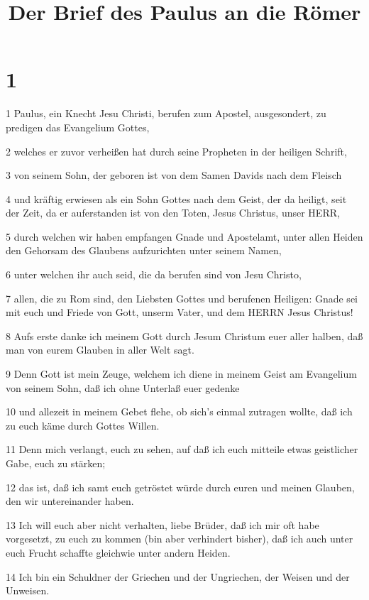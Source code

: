 

\title{Der Brief des Paulus an die Römer}


\chapter{1}

\par 1 Paulus, ein Knecht Jesu Christi, berufen zum Apostel, ausgesondert, zu predigen das Evangelium Gottes,
\par 2 welches er zuvor verheißen hat durch seine Propheten in der heiligen Schrift,
\par 3 von seinem Sohn, der geboren ist von dem Samen Davids nach dem Fleisch
\par 4 und kräftig erwiesen als ein Sohn Gottes nach dem Geist, der da heiligt, seit der Zeit, da er auferstanden ist von den Toten, Jesus Christus, unser HERR,
\par 5 durch welchen wir haben empfangen Gnade und Apostelamt, unter allen Heiden den Gehorsam des Glaubens aufzurichten unter seinem Namen,
\par 6 unter welchen ihr auch seid, die da berufen sind von Jesu Christo,
\par 7 allen, die zu Rom sind, den Liebsten Gottes und berufenen Heiligen: Gnade sei mit euch und Friede von Gott, unserm Vater, und dem HERRN Jesus Christus!
\par 8 Aufs erste danke ich meinem Gott durch Jesum Christum euer aller halben, daß man von eurem Glauben in aller Welt sagt.
\par 9 Denn Gott ist mein Zeuge, welchem ich diene in meinem Geist am Evangelium von seinem Sohn, daß ich ohne Unterlaß euer gedenke
\par 10 und allezeit in meinem Gebet flehe, ob sich's einmal zutragen wollte, daß ich zu euch käme durch Gottes Willen.
\par 11 Denn mich verlangt, euch zu sehen, auf daß ich euch mitteile etwas geistlicher Gabe, euch zu stärken;
\par 12 das ist, daß ich samt euch getröstet würde durch euren und meinen Glauben, den wir untereinander haben.
\par 13 Ich will euch aber nicht verhalten, liebe Brüder, daß ich mir oft habe vorgesetzt, zu euch zu kommen (bin aber verhindert bisher), daß ich auch unter euch Frucht schaffte gleichwie unter andern Heiden.
\par 14 Ich bin ein Schuldner der Griechen und der Ungriechen, der Weisen und der Unweisen.
